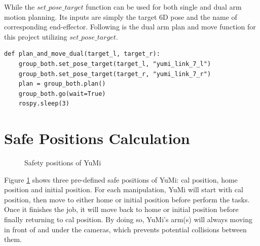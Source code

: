 While the $set\_pose\_target$ function can be used for both single and dual arm motion planning. Its inputs are simply the target 6D pose and the name of corresponding end-effector. Following is the dual arm plan and move function for this project utilizing $set\_pose\_target$. 

\begin{verbatim}
def plan_and_move_dual(target_l, target_r):
    group_both.set_pose_target(target_l, "yumi_link_7_l")
    group_both.set_pose_target(target_r, "yumi_link_7_r")
    plan = group_both.plan()
    group_both.go(wait=True)
    rospy.sleep(3)
\end{verbatim}



\section{Safe Positions Calculation} \label{safetyposescalculation}

\begin{figure}[H]
\centering
{}
\caption{Safety positions of YuMi}
\label{safeposition}
\end{figure}

Figure \ref{safeposition} shows three pre-defined safe positions of YuMi: cal position, home position and initial position. For each manipulation, YuMi will start with cal position, then move to either home or initial position before perform the tasks. Once it finishes the job, it will move back to home or initial position before finally returning to cal position. By doing so, YuMi's arm(s) will always moving in front of and under the cameras, which prevents potential collisions between them.

